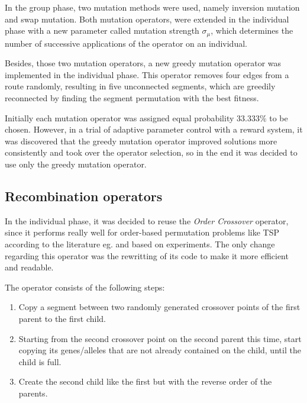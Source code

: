 \documentclass[a4paper,10pt]{article}
\newcommand{\ReplaceMe}[1]{{\color{blue}#1}}
\begin{document}
In the group phase, two mutation methods were used, namely inversion mutation and swap mutation. Both mutation operators, were extended in the individual phase with a new parameter called mutation strength $\sigma_\mu$, which determines the number of successive applications of the operator on an individual.

Besides, those two mutation operators, a new greedy mutation operator was implemented in the individual phase. This operator removes four edges from a route randomly, resulting in five unconnected segments, which are greedily reconnected by finding the segment permutation with the best fitness.

Initially each mutation operator was assigned equal probability $33.333\%$ to be chosen. However, in a trial of adaptive parameter control with a reward system, it was discovered that the greedy mutation operator improved solutions more consistently and took over the operator selection, so in the end it was decided to use only the greedy mutation operator.

\subsection{Recombination operators} \label{ss:recombination}


In the individual phase, it was decided to reuse the \textit{Order Crossover} \cite{davis} operator, since it performs really well for order-based permutation problems like TSP according to the literature eg. \cite{memetic} and based on experiments. The only change regarding this operator was the rewritting of its code to make it more efficient and readable.

The operator consists of the following steps:
\begin{enumerate}
\item Copy a segment between two randomly generated crossover points of the first parent to the first child.
\item Starting from the second crossover point on the second parent this time, start copying its genes/alleles that are not already contained on the child, until the child is full.
\item Create the second child like the first but with the reverse order of the parents.
\end{enumerate}
\end{document}
